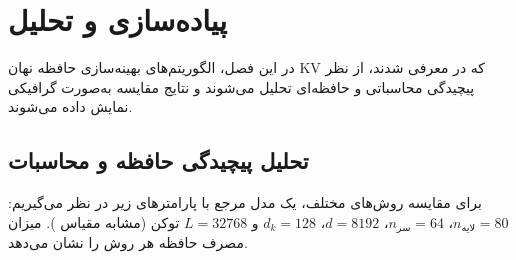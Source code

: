 \chapter{پیاده‌سازی و تحلیل}
\label{chap:implementation}

در این فصل، الگوریتم‌های بهینه‌سازی حافظه نهان KV که در  معرفی شدند، از نظر پیچیدگی محاسباتی و حافظه‌ای تحلیل می‌شوند و نتایج مقایسه به‌صورت گرافیکی نمایش داده می‌شوند.

\section{تحلیل پیچیدگی حافظه و محاسبات}
برای مقایسه روش‌های مختلف، یک مدل مرجع با پارامترهای زیر در نظر می‌گیریم: $n_{\text{لایه}} = 80$، $n_{\text{سر}} = 64$، $d = 8192$، $d_k = 128$ و $L = 32768$ توکن (مشابه مقیاس ).  میزان مصرف حافظه هر روش را نشان می‌دهد.

